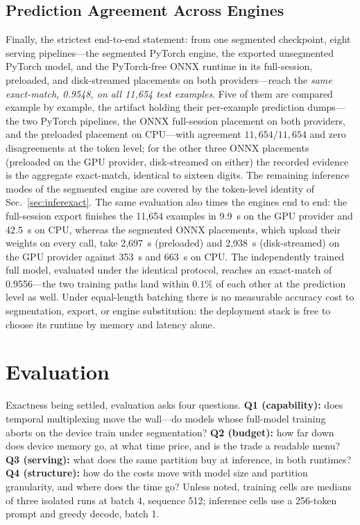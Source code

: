 \documentclass[journal]{IEEEtran}
\begin{document}
\subsection{Prediction Agreement Across Engines}\label{sec:predagree}
Finally, the strictest end-to-end statement: from one segmented checkpoint,
eight serving pipelines---the segmented PyTorch engine, the exported
unsegmented PyTorch model, and the PyTorch-free ONNX runtime in its
full-session, preloaded, and disk-streamed placements on both
providers---reach the \emph{same exact-match, 0.9548, on all 11{,}654 test
examples}. Five of them are compared example by example, the artifact holding
their per-example prediction dumps---the two PyTorch pipelines, the ONNX
full-session placement on both providers, and the preloaded placement on
CPU---with agreement $11{,}654/11{,}654$ and zero disagreements at the token
level; for the other three ONNX placements (preloaded on the GPU provider,
disk-streamed on either) the recorded evidence is the aggregate exact-match,
identical to sixteen digits. The remaining
inference modes of the segmented engine are covered by the token-level
identity of Sec.~\ref{sec:inferexact}. The same evaluation also times the
engines end to end: the full-session export finishes the 11{,}654 examples
in 9.9~s on the GPU provider and 42.5~s on CPU, whereas the segmented
ONNX placements, which upload their weights on every call, take
2{,}697~s (preloaded) and 2{,}938~s (disk-streamed) on the GPU provider
against 353~s and 663~s on CPU. The independently trained full
model, evaluated under the identical protocol, reaches an exact-match of
0.9556---the two training paths land within $0.1\%$ of each other at the
prediction level as well. Under equal-length batching there is no
measurable accuracy cost to segmentation, export, or engine substitution:
the deployment stack is free to choose its runtime by memory and latency
alone.

\section{Evaluation}\label{sec:eval}
Exactness being settled, evaluation asks four questions. \textbf{Q1
(capability):} does temporal multiplexing move the wall---do models whose
full-model training aborts on the device train under segmentation?
\textbf{Q2 (budget):} how far down does device memory go, at what time
price, and is the trade a readable menu? \textbf{Q3 (serving):} what does
the same partition buy at inference, in both runtimes? \textbf{Q4
(structure):} how do the costs move with model size and partition
granularity, and where does the time go? Unless noted, training cells are
medians of three isolated runs at batch 4, sequence 512; inference cells use
a 256-token prompt and greedy decode, batch 1.
\end{document}
